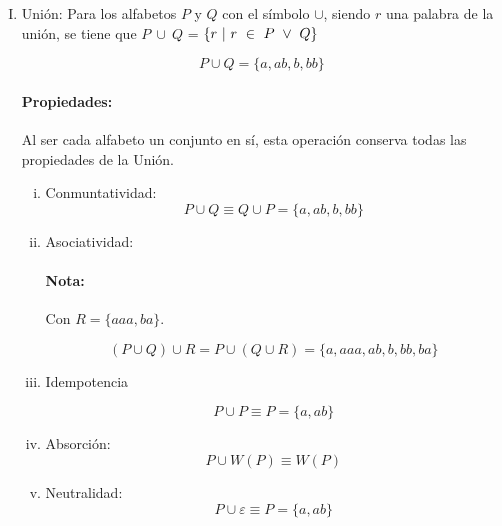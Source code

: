\begin{enumerate}[I.]
\item {}Unión: Para los alfabetos $P$ y $Q$ con el símbolo $\cup$, siendo $r$ una
palabra de la unión, se tiene que $P\ \cup\ Q$ = $\{ r\ \arrowvert\ r\ \in\ P\
\vee\ Q\}$ {

\ejem

\begin{equation}
P \cup Q = \{a,ab,b,bb\}
\end{equation}

\paragraph*{Propiedades:} Al ser cada alfabeto un conjunto en sí, esta 
operación 
conserva todas las propiedades de la Unión.

\begin{enumerate}[i.]

\item Conmuntatividad:
{
\begin{equation}
P \cup Q \equiv Q \cup P = \{a,ab,b,bb\}
\end{equation}
}
\item Asociatividad:
{

\paragraph*{Nota:} Con $R= \{aaa,ba\}$.


\begin{equation}
(P \cup Q) \cup R = P \cup (Q \cup R) = \{a,aaa,ab,b,bb,ba\}
\end{equation}

}
\item Idempotencia
{
\begin{equation}
P \cup P \equiv P = \{a,ab\}
\end{equation}

}
\item Absorción:
{
\begin{equation}
P \cup W(P) \equiv W(P)
\end{equation}
}
\item Neutralidad:
{
\begin{equation}
P \cup \varepsilon \equiv P = \{a,ab\}
\end{equation}
}
\end{enumerate}

}
%


\end{enumerate}
